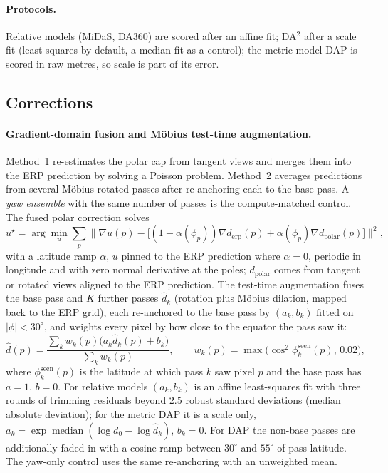 \documentclass{article}
\begin{document}
\paragraph{Protocols.} Relative models (MiDaS, DA360) are scored after an affine fit; DA$^2$ after a scale fit (least squares by default, a median fit as a control); the metric model DAP is scored in raw metres, so scale is part of its error.

\subsection{Corrections}
\paragraph{Gradient-domain fusion and M\"obius test-time augmentation.} Method~1 re-estimates the polar cap from tangent views and merges them into the ERP prediction by solving a Poisson problem. Method~2 averages predictions from several M\"obius-rotated passes after re-anchoring each to the base pass. A \emph{yaw ensemble} with the same number of passes is the compute-matched control. The fused polar correction solves
\begin{equation}
u^\star=\arg\min_u\sum_p\big\|\nabla u(p)-\big[(1-\alpha(\phi_p))\nabla d_{\mathrm{erp}}(p)+\alpha(\phi_p)\nabla d_{\mathrm{polar}}(p)\big]\big\|^2,
\end{equation}
with a latitude ramp $\alpha$, $u$ pinned to the ERP prediction where $\alpha=0$, periodic in longitude and with zero normal derivative at the poles; $d_{\mathrm{polar}}$ comes from tangent or rotated views aligned to the ERP prediction. The test-time augmentation fuses the base pass and $K$ further passes $\hat d_k$ (rotation plus M\"obius dilation, mapped back to the ERP grid), each re-anchored to the base pass by $(a_k,b_k)$ fitted on $|\phi|<30^\circ$, and weights every pixel by how close to the equator the pass saw it:
\begin{equation}
\hat d(p)=\frac{\sum_{k}w_k(p)\big(a_k\hat d_k(p)+b_k\big)}{\sum_{k}w_k(p)},\qquad w_k(p)=\max\!\big(\cos^2\phi^{\mathrm{seen}}_k(p),\,0.02\big),
\end{equation}
where $\phi^{\mathrm{seen}}_k(p)$ is the latitude at which pass $k$ saw pixel $p$ and the base pass has $a=1$, $b=0$. For relative models $(a_k,b_k)$ is an affine least-squares fit with three rounds of trimming residuals beyond $2.5$ robust standard deviations (median absolute deviation); for the metric DAP it is a scale only, $a_k=\exp\operatorname{median}(\log d_0-\log\hat d_k)$, $b_k=0$. For DAP the non-base passes are additionally faded in with a cosine ramp between $30^\circ$ and $55^\circ$ of pass latitude. The yaw-only control uses the same re-anchoring with an unweighted mean.
\end{document}

